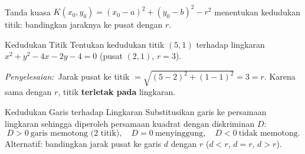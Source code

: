 \documentclass[11pt,a4paper]{report}
\theoremstyle{gaya}
\newcommand{\jawab}{\par\smallskip\noindent\textit{\textcolor{oranye}{Penyelesaian:}}\ }
\begin{document}
\begin{center}
\\
\small Tanda kuasa $K(x_0,y_0)=(x_0-a)^2+(y_0-b)^2-r^2$ menentukan kedudukan titik: bandingkan jaraknya ke pusat dengan $r$.
\end{center}

\begin{contoh}{Kedudukan Titik}
Tentukan kedudukan titik $(5,1)$ terhadap lingkaran $x^2+y^2-4x-2y-4=0$ (pusat $(2,1)$, $r=3$).

\jawab Jarak pusat ke titik $=\sqrt{(5-2)^2+(1-1)^2}=3=r$. Karena sama dengan $r$, titik \textbf{terletak pada} lingkaran.
\end{contoh}

\begin{konsep}{Kedudukan Garis terhadap Lingkaran}
Substitusikan garis ke persamaan lingkaran sehingga diperoleh persamaan kuadrat dengan diskriminan $D$:
\[
D>0 \ \text{garis memotong (2 titik)}, \quad
D=0 \ \text{menyinggung}, \quad
D<0 \ \text{tidak memotong}.
\]
Alternatif: bandingkan jarak pusat ke garis $d$ dengan $r$ ($d<r$, $d=r$, $d>r$).
\end{konsep}
\end{document}
